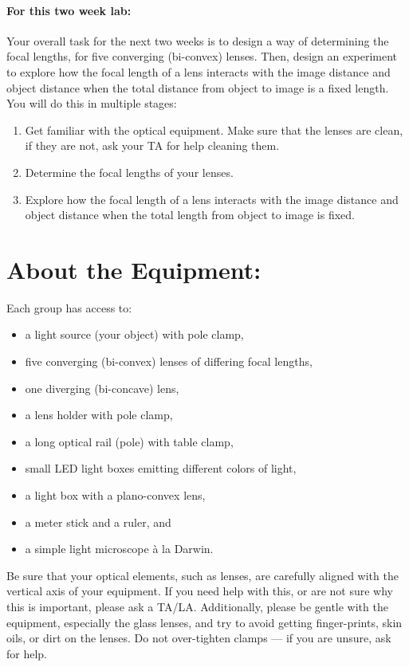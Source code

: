 \paragraph{For this two week lab:} Your overall task for the next two weeks is to design a way of determining the focal lengths, for five converging (bi-convex) lenses.
Then, design an experiment to explore how the focal length of a lens interacts with the image distance and object distance when the total distance from object to image is a fixed length.
You will do this in multiple stages:
\begin{enumerate}
\itemsep-0.2em
\item Get familiar with the optical equipment. Make sure that the lenses are clean, if they are not, ask your TA for help cleaning them.
\item Determine the focal lengths of your lenses.
\item Explore how the focal length of a lens interacts with the image distance and object distance when the total length from object to image is fixed.
\end{enumerate}

\section*{About the Equipment:}
Each group has access to:
\begin{itemize}
\itemsep-0.3em
\item a light source (your object) with pole clamp,
\item five converging (bi-convex) lenses of differing focal lengths,
\item one diverging (bi-concave) lens,
\item a lens holder with pole clamp,
\item a long optical rail (pole) with table clamp,
\item small LED light boxes emitting different colors of light,
\item a light box with a plano-convex lens,
\item a meter stick and a ruler, and
\item a simple light microscope à la Darwin.
\end{itemize}
Be sure that your optical elements, such as lenses, are carefully aligned with the vertical axis of your equipment. 
If you need help with this, or are not sure why this is important, please ask a TA/LA. 
Additionally, please be gentle with the equipment, especially the glass lenses, and try to avoid getting finger-prints, skin oils, or dirt on the lenses. Do not over-tighten clamps — if you are unsure, ask for help.
